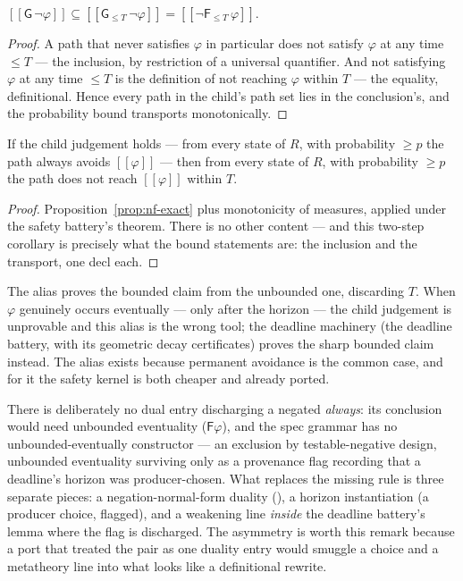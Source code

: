 \begin{bprop}\label{prop:nf-exact}
$[\![\mathsf{G}\,\neg\varphi]\!] \subseteq
[\![\mathsf{G}_{\le T}\,\neg\varphi]\!] =
[\![\neg\mathsf{F}_{\le T}\,\varphi]\!]$.
\end{bprop}
\begin{proof}
A path that never satisfies $\varphi$ in particular does not satisfy
$\varphi$ at any time $\le T$ --- the inclusion, by restriction of a
universal quantifier. And not satisfying $\varphi$ at any time $\le T$
is the definition of not reaching $\varphi$ within $T$ --- the equality,
definitional. Hence every path in the child's path set lies in the
conclusion's, and the probability bound transports monotonically.
\end{proof}

\begin{bprop}\label{prop:nf-sound}
If the child judgement holds --- from every state of $R$, with
probability $\ge p$ the path always avoids $[\![\varphi]\!]$ --- then
from every state of $R$, with probability $\ge p$ the path does not
reach $[\![\varphi]\!]$ within $T$.
\end{bprop}
\begin{proof}
Proposition~\ref{prop:nf-exact} plus monotonicity of measures, applied
under the safety battery's theorem. There is no other content --- and
this two-step corollary is precisely what the bound statements are:
the inclusion and the transport, one decl each.
\end{proof}

\begin{bremark}\label{rem:nf-lossy}
The alias proves the bounded claim from the unbounded one, discarding
$T$. When $\varphi$ genuinely occurs eventually --- only after the
horizon --- the child judgement is unprovable and this alias is the wrong
tool; the deadline machinery (the deadline battery, with its geometric
decay certificates) proves the sharp bounded claim instead. The alias
exists because permanent avoidance is the common case, and for it the
safety kernel is both cheaper and already ported.
\end{bremark}

\begin{bremark}\label{rem:nf-mirror}
There is deliberately no dual entry discharging a negated
\emph{always}: its conclusion would need unbounded eventuality
($\mathsf{F}\varphi$), and the spec grammar has no unbounded-eventually
constructor --- an exclusion by testable-negative design, unbounded
eventuality surviving only as a provenance flag recording that a
deadline's horizon was producer-chosen. What replaces the missing rule
is three separate pieces: a negation-normal-form duality
(), a horizon instantiation (a producer choice,
flagged), and a weakening line \emph{inside} the deadline battery's
lemma where the flag is discharged. The asymmetry is worth this remark
because a port that treated the pair as one duality entry would smuggle
a choice and a metatheory line into what looks like a definitional
rewrite.
\end{bremark}

